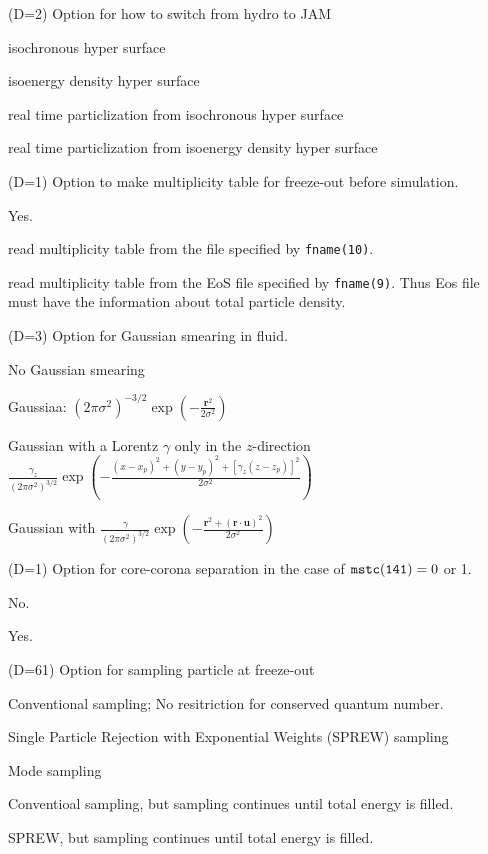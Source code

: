 \documentclass[]{article}
\newenvironment{entry}%
{\begin{list}{}{\setlength{\topsep}{0mm} \setlength{\itemsep}{0mm}
\setlength{\parskip}{0mm} \setlength{\parsep}{0mm}
\setlength{\leftmargin}{20mm} \setlength{\rightmargin}{0mm}
\setlength{\labelwidth}{18mm} \setlength{\labelsep}{2mm}}}%
{\end{list}}
\newenvironment{subentry}%
{\begin{list}{}{\setlength{\topsep}{0mm} \setlength{\itemsep}{0mm}
\setlength{\parskip}{0mm} \setlength{\parsep}{0mm}
\setlength{\leftmargin}{10mm} \setlength{\rightmargin}{0mm}
\setlength{\labelwidth}{18mm} \setlength{\labelsep}{2mm}}}%
{\end{list}}
\newcommand{\ttt}[1]{{\tt#1}}
\newcommand{\itemt}[1]{\item[{\tt #1}\hfill]}
\begin{document}
\begin{entry}
\itemt{mstc(144) :}(D=2) Option for how to switch from hydro to JAM
 \begin{subentry}
    \itemt{$=1$ :} isochronous hyper surface
    \itemt{$=2$ :} isoenergy density hyper surface
    \itemt{$=11$ :} real time particlization from isochronous hyper surface
    \itemt{$=12$ :} real time particlization from isoenergy density hyper surface
 \end{subentry}

\itemt{mstc(145) :}(D=1) Option to make multiplicity table
 for freeze-out before simulation.
 \begin{subentry}
    \itemt{$=0$ :} Yes.
    \itemt{$=1$ :} read multiplicity table from the file specified by
    \ttt{fname(10)}.
    \itemt{$=2$ :} read multiplicity table from the EoS file specified by
    \ttt{fname(9)}. Thus Eos file must have the information about total particle
    density.
 \end{subentry}


\itemt{mstc(146) :}(D=3) Option for Gaussian smearing in fluid.
 \begin{subentry}
    \itemt{$=0$ :} No Gaussian smearing
    \itemt{$=1$ :} Gaussiaa:
    $(2\pi\sigma^2)^{-3/2}
         \exp\left(-\frac{\bm{r}^2}{2\sigma^2}\right)$
    \itemt{$=2$ :} Gaussian with a Lorentz $\gamma$ only in the $z$-direction
    $\frac{\gamma_z}{(2\pi\sigma^2)^{3/2}}
    \exp\left(-\frac{(x-x_p)^2+(y-y_p)^2+[\gamma_z(z-z_p)]^2}{2\sigma^2}\right)$
    \itemt{$=3$ :} Gaussian with $\frac{\gamma}{(2\pi\sigma^2)^{3/2}}
         \exp\left(-\frac{\bm{r}^2+(\bm{r}\cdot\bm{u})^2}{2\sigma^2}\right)$
 \end{subentry}

\itemt{mstc(147) :}(D=1) Option for core-corona separation 
in the case of ${\tt mstc(141)}=0$ or 1.
 \begin{subentry}
    \itemt{$=0$ :} No.
    \itemt{$=1$ :} Yes.
 \end{subentry}

\itemt{mstc(148) :}(D=61) Option for sampling particle at freeze-out
 \begin{subentry}
    \itemt{$=0$ :} Conventional sampling; 
      No resitriction for conserved quantum number.
    \itemt{$=2$ :} Single Particle Rejection with Exponential Weights
     (SPREW) sampling
    \itemt{$=10$ :} Mode sampling
    \itemt{$=11$ :} Conventioal sampling, but sampling continues until
    total energy is filled.
    \itemt{$=12$ :} SPREW, but sampling continues until
    total energy is filled.
 \end{subentry}
  

\end{entry}
\end{document}
